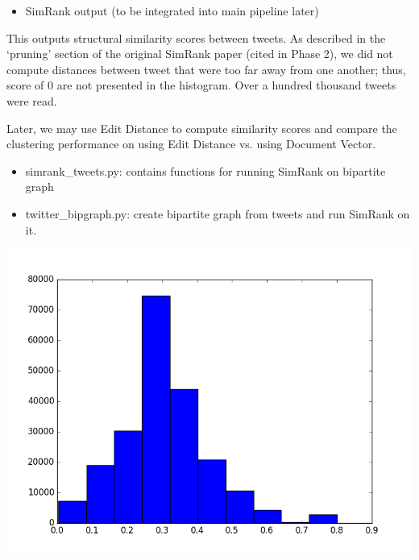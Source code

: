 \documentclass[10pt]{article}
\begin{document}
\begin{itemize}
	\item SimRank output (to be integrated into main pipeline later)
\end{itemize}
This outputs structural similarity scores between tweets. As described in the ‘pruning’ section of the original SimRank paper (cited in Phase 2), we did not compute distances between tweet that were too far away from one another; thus, score of 0 are not presented in the histogram. Over a hundred thousand tweets were read.

Later, we may use Edit Distance to compute similarity scores and compare the clustering performance on using Edit Distance vs. using Document Vector. 

\begin{itemize}
	\item simrank\_tweets.py: contains functions for running SimRank on bipartite graph
	\item twitter\_bipgraph.py: create bipartite graph from tweets and run SimRank on it.
\end{itemize}

\includegraphics[scale=0.5]{simrank_histogram.png}



\end{document}
